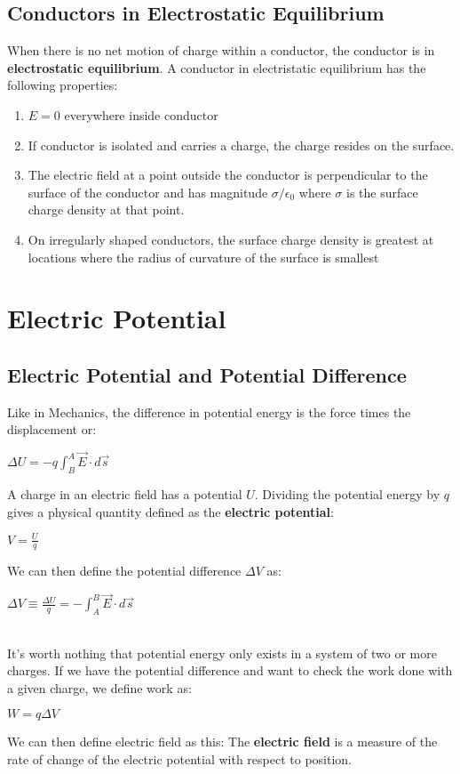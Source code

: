 \documentclass[12pt]{report}
\begin{document}
	\section{Conductors in Electrostatic Equilibrium}
		When there is no net motion of charge within a conductor, the conductor is in \textbf{electrostatic equilibrium}. A conductor in electristatic equilibrium has the following properties:
		\begin{enumerate}
			\item $E = 0$ everywhere inside conductor
			\item If conductor is isolated and carries a charge, the charge resides on the surface.
			\item The electric field at a point outside the conductor is perpendicular to the surface of the conductor and has magnitude $\sigma/\epsilon_0$ where $\sigma$ is the surface charge density at that point.
			\item On irregularly shaped conductors, the surface charge density is greatest at locations where the radius of curvature of the surface is smallest
		\end{enumerate}
\chapter{Electric Potential}
	\section{Electric Potential and Potential Difference}
		Like in Mechanics, the difference in potential energy is the force times the displacement or:\\
		\centerline{$\Delta U = -q \int_{B}^{A} \vec{E} \cdot d\vec{s}$}
		A charge in an electric field has a potential $U$. Dividing the potential energy by $q$ gives a physical quantity defined as the \textbf{electric potential}:\\
		\centerline{$V = \frac{U}{q}$}
		We can then define the potential difference $\Delta V$ as:\\
		\centerline{$\Delta V \equiv \frac{\Delta U}{q} = -\int_{A}^{B} \vec{E} \cdot d\vec{s}$}\\
		It's worth nothing that potential energy only exists in a system of two or more charges. If we have the potential difference and want to check the work done with a given charge, we define work as:\\
		\centerline{$W = q\Delta V$}
		We can then define electric field as this: The \textbf{electric field} is a measure of the rate of change of the electric potential with respect to position.
\end{document}

